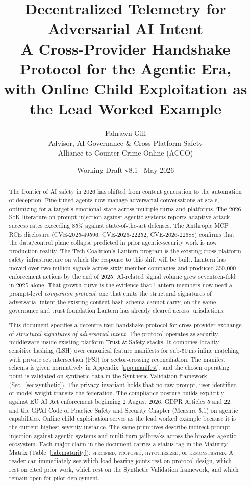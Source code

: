 \documentclass[11pt]{article}
\title{\vspace{-1.2cm}\textbf{Decentralized Telemetry for Adversarial AI Intent}\\[4pt]
\large A Cross-Provider Handshake Protocol for the Agentic Era,\\with Online Child Exploitation as the Lead Worked Example}
\author{Fahrawn Gill\\ \small Advisor, AI Governance \& Cross-Platform Safety \\ \small Alliance to Counter Crime Online (ACCO)}
\date{Working Draft v8.1 \textbullet\ May 2026}
\begin{document}
\maketitle
\thispagestyle{fancy}

\begin{abstract}
\noindent The frontier of AI safety in 2026 has shifted from content generation to the automation of deception. Fine-tuned agents now manage adversarial conversations at scale, optimizing for a target's emotional state across multiple turns and platforms. The 2026 SoK literature on prompt injection against agentic systems reports adaptive attack success rates exceeding 85\% against state-of-the-art defenses. The Anthropic MCP RCE disclosure (CVE-2025-49596, CVE-2026-22252, CVE-2026-22688) confirms that the data/control plane collapse predicted in prior agentic-security work is now production reality. The Tech Coalition's Lantern program is the existing cross-platform safety infrastructure on which the response to this shift will be built. Lantern has moved over two million signals across sixty member companies and produced 350{,}000 enforcement actions by the end of 2025. AI-related signal volume grew seventeen-fold in 2025 alone. That growth curve is the evidence that Lantern members now need a prompt-level \emph{companion protocol}, one that emits the structural signatures of adversarial intent the existing content-hash schema cannot carry, on the same governance and trust foundation Lantern has already cleared across jurisdictions.

This document specifies a decentralized handshake protocol for cross-provider exchange of \emph{structural signatures of adversarial intent}. The protocol operates as security middleware inside existing platform Trust \& Safety stacks. It combines locality-sensitive hashing (LSH) over canonical feature manifests for sub-50\,ms inline matching with private set intersection (PSI) for sector-crossing reconciliation. The manifest schema is given normatively in Appendix~\ref{app:manifest}, and the chosen operating point is validated on synthetic data in the Synthetic Validation framework (Sec.~\ref{sec:synthetic}). The privacy invariant holds that no raw prompt, user identifier, or model weight transits the federation. The compliance posture builds explicitly against EU AI Act enforcement beginning 2 August 2026, GDPR Articles 5 and 22, and the GPAI Code of Practice Safety and Security Chapter (Measure 5.1) on agentic capabilities. Online child exploitation serves as the lead worked example because it is the current highest-severity instance. The same primitives describe indirect prompt injection against agentic systems and multi-turn jailbreaks across the broader agentic ecosystem. Each major claim in the document carries a status tag in the Maturity Matrix (Table~\ref{tab:maturity}): \textsc{specified}, \textsc{proposed}, \textsc{hypothesized}, or \textsc{demonstrated}. A reader can immediately see which load-bearing joints rest on protocol design, which rest on cited prior work, which rest on the Synthetic Validation framework, and which remain open for pilot deployment.
\end{abstract}
\end{document}
